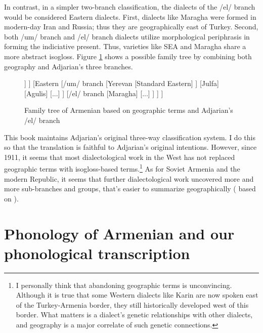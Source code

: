In contrast, in a simpler two-branch classification, the dialects of the /el/ branch would be considered Eastern dialects. First, dialects like Maragha were formed in modern-day Iran and Russia; thus they are geographically east of Turkey. Second, both /um/ branch and /el/ branch dialects utilize morphological periphrasis in forming the indiciative present. Thus, varieties like SEA and Maragha share a more abstract isogloss. Figure \ref{tree:dialect:compromise} shows a possible family tree by combining both geography and Adjarian's three branches. 

\begin{figure}[H]
	\caption{Family tree of Armenian based on geographic terms and Adjarian's /el/ branch}
	\label{tree:dialect:compromise}
	\centering
	\begin{forest}
		[{Classical Armenian} [{Western (/kə/ branch)} [... ] [Trabzon ] [Crimea ] [Istanbul [{Standard Western}] ] ] [Eastern [{/um/ branch} [Yerevan [{Standard Eastern}] ] [Julfa] [Agulis] [...] ] [/el/ branch [Maragha] [...] ] ] ]
	\end{forest}
	
\end{figure}
 
This book maintains Adjarian's original three-way classification system. I do this so that the translation is faithful to Adjarian's original intentions. However, since 1911, it seems that most dialectological work in the West has not replaced geographic terms with isogloss-based terms.\footnote{I personally think that abandoning geographic terms is unconvincing. Although it is true that some Western dialects like Karin are now spoken east of the Turkey-Armenia border, they still historically developed west of this border. What matters is a dialect's genetic relationships with other dialects, and geography is a major correlate of such genetic connections. } As for Soviet Armenia and the modern Republic, it seems that further dialectological work uncovered more and more sub-branches and groups, that's easier to summarize geographically (\citealt[\S 4]{Martirosyan-2019-Armeniandialects} based on \citealt{Jahukyan-1972-ArmenianDiaolectology}). 



 \section{Phonology of Armenian and our phonological transcription}\label{sec:HossepIntro:phonotransc}

